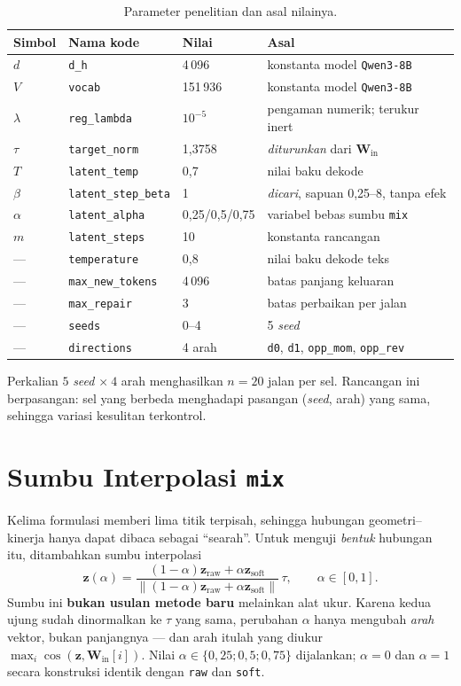 \documentclass{laporanta1statugm}
\newcommand{\code}[1]{\texttt{#1}}
\begin{document}
\begin{table}[htbp]
\centering
\caption{Parameter penelitian dan asal nilainya.}
\label{tab:parameter}
\small
\begin{tabular}{llll}
\hline
Simbol & Nama kode & Nilai & Asal \\
\hline
$d$ & \code{d\_h} & 4\,096 & konstanta model \code{Qwen3-8B} \\
$V$ & \code{vocab} & 151\,936 & konstanta model \code{Qwen3-8B} \\
$\lambda$ & \code{reg\_lambda} & $10^{-5}$ & pengaman numerik; terukur inert \\
$\tau$ & \code{target\_norm} & 1,3758 & \emph{diturunkan} dari $\bm{W}_{\text{in}}$ \\
$T$ & \code{latent\_temp} & 0,7 & nilai baku dekode \\
$\beta$ & \code{latent\_step\_beta} & 1 & \emph{dicari}, sapuan 0,25--8, tanpa efek \\
$\alpha$ & \code{latent\_alpha} & 0,25/0,5/0,75 & variabel bebas sumbu \code{mix} \\
$m$ & \code{latent\_steps} & 10 & konstanta rancangan \\
--- & \code{temperature} & 0,8 & nilai baku dekode teks \\
--- & \code{max\_new\_tokens} & 4\,096 & batas panjang keluaran \\
--- & \code{max\_repair} & 3 & batas perbaikan per jalan \\
--- & \code{seeds} & 0--4 & 5 \textit{seed} \\
--- & \code{directions} & 4 arah & \code{d0}, \code{d1}, \code{opp\_mom}, \code{opp\_rev} \\
\hline
\end{tabular}
\end{table}

Perkalian $5$ \textit{seed} $\times\ 4$ arah menghasilkan $n = 20$ jalan per
sel. Rancangan ini berpasangan: sel yang berbeda menghadapi pasangan
(\textit{seed}, arah) yang sama, sehingga variasi kesulitan terkontrol.

\section{Sumbu Interpolasi \code{mix}}

Kelima formulasi memberi lima titik terpisah, sehingga hubungan
geometri--kinerja hanya dapat dibaca sebagai ``searah''. Untuk menguji
\emph{bentuk} hubungan itu, ditambahkan sumbu interpolasi
\begin{equation}
  \bm{z}(\alpha) = \frac{(1-\alpha)\bm{z}_{\text{raw}} + \alpha\bm{z}_{\text{soft}}}
  {\lVert(1-\alpha)\bm{z}_{\text{raw}} + \alpha\bm{z}_{\text{soft}}\rVert}\,\tau,
  \qquad \alpha\in[0,1].
  \label{eq:mix}
\end{equation}
Sumbu ini \textbf{bukan usulan metode baru} melainkan alat ukur. Karena kedua
ujung sudah dinormalkan ke $\tau$ yang sama, perubahan $\alpha$ hanya mengubah
\emph{arah} vektor, bukan panjangnya --- dan arah itulah yang diukur
$\max_i\cos(\bm{z},\bm{W}_{\text{in}}[i])$. Nilai $\alpha\in\{0{,}25;0{,}5;0{,}75\}$
dijalankan; $\alpha=0$ dan $\alpha=1$ secara konstruksi identik dengan
\code{raw} dan \code{soft}.
\end{document}
